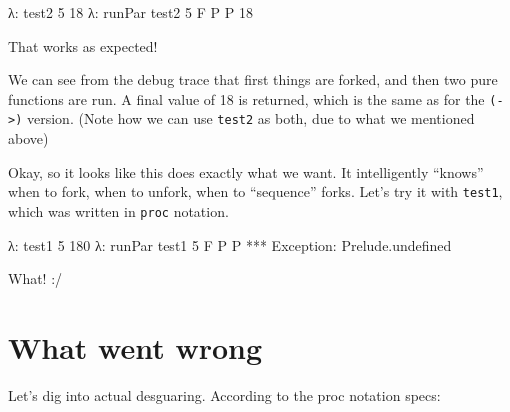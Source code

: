 \documentclass[]{article}
\newenvironment{Shaded}{}{}
\newcommand{\DataTypeTok}[1]{\textcolor[rgb]{0.56,0.13,0.00}{#1}}
\newcommand{\DecValTok}[1]{\textcolor[rgb]{0.25,0.63,0.44}{#1}}
\newcommand{\FunctionTok}[1]{\textcolor[rgb]{0.02,0.16,0.49}{#1}}
\newcommand{\NormalTok}[1]{#1}
\begin{document}
\begin{Shaded}
\begin{Highlighting}[]
\NormalTok{λ}\FunctionTok{:}\NormalTok{ test2 }\DecValTok{5}
\DecValTok{18}
\NormalTok{λ}\FunctionTok{:}\NormalTok{ runPar test2 }\DecValTok{5}
\DataTypeTok{F}
\DataTypeTok{P}
\DataTypeTok{P}
\DecValTok{18}
\end{Highlighting}
\end{Shaded}

That works as expected!

We can see from the debug trace that first things are forked, and then two pure
functions are run. A final value of 18 is returned, which is the same as for the
\texttt{(-\textgreater{})} version. (Note how we can use \texttt{test2} as both,
due to what we mentioned above)

Okay, so it looks like this does exactly what we want. It intelligently
``knows'' when to fork, when to unfork, when to ``sequence'' forks. Let's try it
with \texttt{test1}, which was written in \texttt{proc} notation.

\begin{Shaded}
\begin{Highlighting}[]
\NormalTok{λ}\FunctionTok{:}\NormalTok{ test1 }\DecValTok{5}
\DecValTok{180}
\NormalTok{λ}\FunctionTok{:}\NormalTok{ runPar test1 }\DecValTok{5}
\DataTypeTok{F}
\DataTypeTok{P}
\DataTypeTok{P}
\FunctionTok{***} \DataTypeTok{Exception}\FunctionTok{:}\NormalTok{ Prelude.undefined}
\end{Highlighting}
\end{Shaded}

What! :/

\hypertarget{what-went-wrong}{%
\section{What went wrong}\label{what-went-wrong}}

Let's dig into actual desguaring. According to the proc notation specs:
\end{document}
